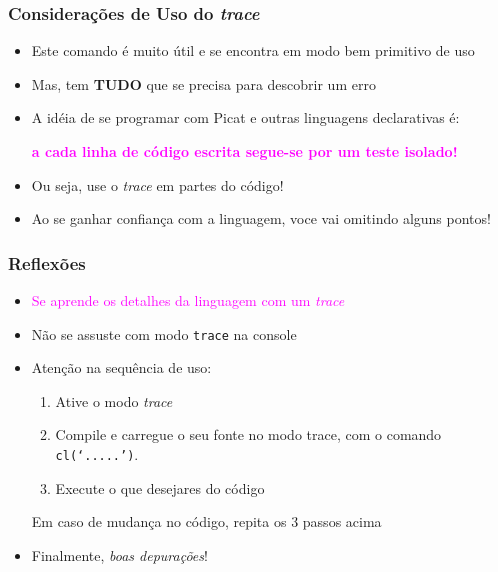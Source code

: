 \begin{frame}[fragile]

\frametitle{Considerações de Uso do \textit{trace}}

\begin{itemize}
  \item Este comando é muito útil e se encontra em modo bem
  primitivo de uso
  
  \item Mas, tem \textbf{TUDO} que se precisa para descobrir um erro
  
  \pause
  \item A idéia de se programar com Picat e outras linguagens
  declarativas é: 

  \pause
  \textcolor{magenta}{\textbf{a cada linha de código escrita segue-se por um teste isolado!}}

  \pause
  \item Ou seja,  use o \textit{trace} em partes do código!

  \pause
  \item Ao se ganhar confiança com a linguagem, voce vai omitindo alguns pontos!

  
\end{itemize}

\end{frame}


\begin{frame}[fragile]
\frametitle{Reflexões}

\begin{itemize}
  \item \textcolor{magenta}{Se aprende os detalhes da linguagem com um \textit{trace}}
  
  \pause
    \item Não se assuste com modo \texttt{trace} na console
  
  
  \pause
    \item Atenção na sequência de uso: 
    
    \begin{enumerate}
      \item Ative o modo \textit{trace}
      \item Compile e carregue o seu fonte no modo trace, com o comando \texttt{cl(`.....')}.
      \item Execute o que desejares do código

    \end{enumerate}
    \pause
    Em caso de mudança no código, repita os 3 passos acima
    
\pause
    \item Finalmente, \textit{boas depurações}!        
  
\end{itemize}


\end{frame}
